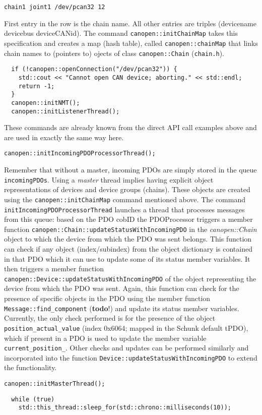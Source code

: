 \begin{verbatim}
chain1 joint1 /dev/pcan32 12
\end{verbatim}
First entry in the row is the chain name. All other entries are triples (devicename devicebus deviceCANid). The command \texttt{canopen::initChainMap} takes this specification and creates a map (hash table), called \texttt{canopen::chainMap} that links chain names to (pointers to) ojects of class \texttt{canopen::Chain} (\texttt{chain.h}).

\begin{verbatim}
  if (!canopen::openConnection("/dev/pcan32")) {
    std::cout << "Cannot open CAN device; aborting." << std::endl;
    return -1;
  } 
  canopen::initNMT();
  canopen::initListenerThread();
\end{verbatim}
These commands are already known from the direct API call examples above and are used in exactly the same way here.

\begin{verbatim}
canopen::initIncomingPDOProcessorThread();
\end{verbatim}
Remember that without a master, incoming PDOs are simply stored in the queue \texttt{incomingPDOs}. Using a {\em master} thread implies having explicit object representations of devices and device groups (chains). These objects are created using the \texttt{canopen::initChainMap} command mentioned above. The command \texttt{initIncomingPDOProcessorThread} launches a thread that processes messages from this queue: based on the PDO cobID the PDOProcessor triggers a member function \texttt{canopen::Chain::updateStatusWithIncomingPDO} in the {\em canopen::Chain} object to which the device from which the PDO was sent belongs. This function can check if any object (index/subindex) from the object dictionary is contained in that PDO which it can use to update some of its status member variables. It then triggers a member function \texttt{canopen::Device::updateStatusWithIncomingPDO} of the object representing the device from which the PDO was sent. Again, this function can check for the presence of specific objects in the PDO using the member function \texttt{Message::find\_component} ({\bf todo}!) and update its status member variables. Currently, the only check performed is for the presence of the object \texttt{position\_actual\_value} (index 0x6064; mapped in the Schunk default tPDO), which if present in a PDO is used to update the member variable \texttt{current\_position\_}. Other checks and updates can be performed similarly and incorporated into the function \texttt{Device::updateStatusWithIncomingPDO} to extend the functionality.

\begin{verbatim}
canopen::initMasterThread();
\end{verbatim}




\begin{verbatim}
  while (true)
    std::this_thread::sleep_for(std::chrono::milliseconds(10));
\end{verbatim}

    

 




